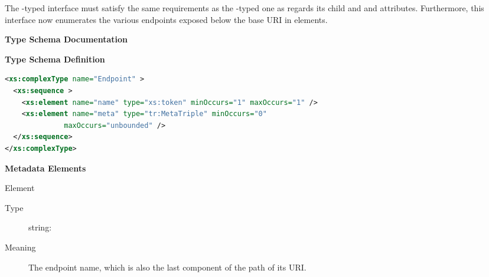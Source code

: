 \documentclass{ivoa}
\begin{document}

The -typed interface must satisfy the same
requirements as the -typed one as regards its
 child and  and  attributes.
Furthermore, this interface now enumerates the various endpoints exposed
below the base URI in  elements.

\begin{generated}
\begingroup
      	\renewcommand*\descriptionlabel[1]{%
      	\hbox to 5.5em{\emph{#1}\hfil}}\vspace{2ex}\noindent\textbf{ Type Schema Documentation}



\vspace{1ex}\noindent\textbf{ Type Schema Definition}

\begin{lstlisting}[language=XML,basicstyle=\footnotesize]
<xs:complexType name="Endpoint" >
  <xs:sequence >
    <xs:element name="name" type="xs:token" minOccurs="1" maxOccurs="1" />
    <xs:element name="meta" type="tr:MetaTriple" minOccurs="0"
              maxOccurs="unbounded" />
  </xs:sequence>
</xs:complexType>
\end{lstlisting}

\vspace{0.5ex}\noindent\textbf{ Metadata Elements}

\begingroup\small\begin{bigdescription}\item[Element \xmlel{name}]
\begin{description}
\item[Type] string: 
\item[Meaning] 
            The endpoint name, which is also the last component of the
            path of its URI.
          

\end{description}
\end{bigdescription}
\end{generated}
\end{document}
